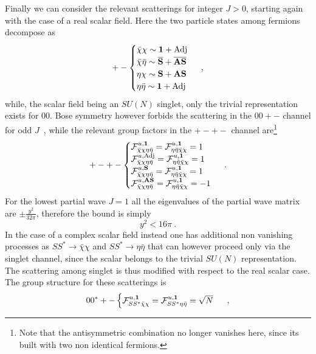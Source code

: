 \documentclass[a4paper,11pt]{article}
\newcommand{\be}{\begin{equation}}
\newcommand{\ee}{\end{equation}}
\newcommand{\nn}{\nonumber}
\begin{document}
Finally we can consider the relevant scatterings for integer $J>0$, starting again with the case of a real scalar field.
Here the two particle states among fermions decompose as
\be\label{eq:model1_J1_dec}
+-
\begin{cases}
 \bar\chi \chi  \sim  {\bf 1}+ {\rm Adj} \nn \\
 \bar\chi \bar\eta  \sim{\rm{\bf{\overline{S}}}}+{\rm{\bf \overline{AS}}} \nn \\
\eta\chi  \sim  {\rm{\bf S}}+{\rm{\bf AS}} \nn \\
\eta\bar\eta \sim  {\bf 1}+ {\rm Adj} \nn \\
\end{cases}  \ ,
\ee
while, the scalar field being an $SU(N)$ singlet, only the trivial representation exists for $00$. Bose symmetry however forbids the scattering in the $00+-$ channel for odd $J$~\cite{Jacob:1959at}, while the relevant group factors in the $+-+-$ channel are\footnote{Note that the antisymmetric combination no longer vanishes here, since its built with two non identical fermions.}
\begin{align}\label{eq:group_model1_J1_A}
+-+-
\begin{cases}
{\cal F}^{u, \bf{1}}_{\bar \chi \chi  \eta \bar \eta} = {\cal F}^{u, \bf{1}}_{  \eta \bar \eta \bar \chi \chi} = 1 \\
%
{\cal F}^{u, {\rm Adj}}_{\bar \chi \chi  \eta \bar \eta} = {\cal F}^{u, \bf{1}}_{  \eta \bar \eta \bar \chi \chi} = 1 \\
%
{\cal F}^{u, {\bf S}}_{\bar \chi \chi  \eta \bar \eta} = {\cal F}^{u, \bf{1}}_{  \eta \bar \eta \bar \chi \chi} = 1 \\
%
{\cal F}^{u, \bf{AS}}_{\bar \chi \chi  \eta \bar \eta} = {\cal F}^{u, \bf{1}}_{  \eta \bar \eta \bar \chi \chi} = -1 \\
\end{cases}  \ .
\end{align}
For the lowest partial wave $J=1$ all the eigenvalues of the partial wave matrix are $\pm \frac{y^2}{32\pi}$, therefore the bound is simply
\be
y^2 < 16\pi \ .
\ee
In the case of a complex scalar field instead one has additional non vanishing processes as $S S^*\to  \bar\chi \chi  $ and $S S^*\to \eta \bar \eta$ that can however proceed only via the singlet channel, since the scalar belongs to the trivial $SU(N)$ representation. The scattering among singlet is thus modified with respect to the real scalar case. 
The group structure for these scatterings is
\begin{align}\label{eq:group_model1_J1_B}
00^*+-
\begin{cases}
{\cal F}^{u, \bf{1}}_{ S S^*\bar \chi \chi }  = {\cal F}^{u, \bf{1}}_{S S^*\eta\bar\eta  } = \sqrt N\\
\end{cases}  \ ,
\end{align}
\end{document}
